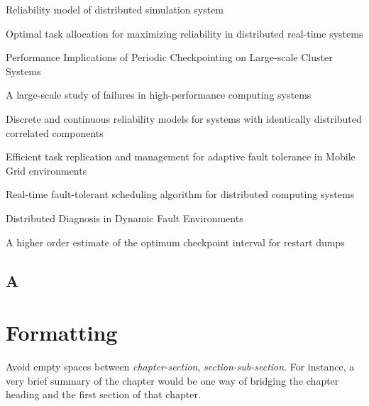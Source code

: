 \documentclass{cslthse-msc}
\begin{document}
\begin{thebibliography}{50}
Reliability model of distributed simulation system

Optimal task allocation for maximizing reliability in distributed real-time systems

Performance Implications of Periodic Checkpointing on Large-scale Cluster Systems

A large-scale study of failures in high-performance computing systems

Discrete and continuous reliability models for systems with identically distributed correlated components

Efficient task replication and management for adaptive fault tolerance in Mobile Grid environments

Real-time fault-tolerant scheduling algorithm for distributed computing systems

Distributed Diagnosis in Dynamic Fault Environments

A higher order estimate of the optimum checkpoint interval for restart dumps

\end{thebibliography}

\begin{appendices}
\chapter{A}

\end{appendices}












\chapter[Short on Formatting]{Formatting}
Avoid empty spaces between \textit{chapter}-\textit{section}, \textit{section}-\textit{sub-section}. For instance, a very brief summary of the chapter would be one way of bridging the chapter heading and the first section of that chapter.
\end{document}
